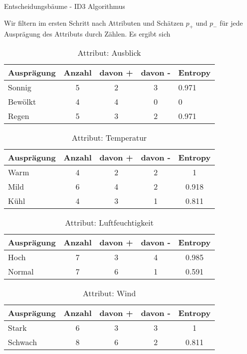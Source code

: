 \begin{task}[credit=16]{Entscheidungsbäume - ID3 Algorithmus}
\begin{subtask}[points=10,title=ID3 Algorithmus]
\begin{solution}
Wir filtern im ersten Schritt nach Attributen und Schätzen $p_+$ und $p_-$ für jede Ausprägung des Attributs durch Zählen. Es ergibt sich
\begin{table}[h!]
	\centering
	\caption{Attribut: Ausblick}
	\begin{tabular}{l|c|c|c|l}
		\toprule
		\textbf{Ausprägung} & \textbf{Anzahl} & \textbf{davon +}  & \textbf{davon -} &\textbf{Entropy} \\
		\midrule
		Sonnig    & 5 &2&3&0.971   \\
		Bewölkt & 4&4&0&0  \\
		Regen    & 5&3&2&0.971    \\
		\bottomrule
	\end{tabular}
\end{table}
\begin{table}[h!]
	\centering
	\caption{Attribut: Temperatur}
	\begin{tabular}{l|c|c|c|c}
		\toprule
		\textbf{Ausprägung} & \textbf{Anzahl} & \textbf{davon +}  & \textbf{davon -} &\textbf{Entropy} \\
		\midrule
		Warm  & 4 &2&2&1      \\
		Mild & 6&4&2&0.918   \\
		Kühl & 4&3&1&0.811    \\
		\bottomrule
	\end{tabular}
\end{table}
\begin{table}[h!]
	\centering
	\caption{Attribut: Luftfeuchtigkeit}
	\begin{tabular}{l|c|c|c|c}
		\toprule
		\textbf{Ausprägung} & \textbf{Anzahl} & \textbf{davon +}  & \textbf{davon -} &\textbf{Entropy} \\
		\midrule
		Hoch  & 7 &3&4&0.985      \\
		Normal & 7&6&1&0.591   \\
		\bottomrule
	\end{tabular}
\end{table}
\begin{table}[h!]
	\centering
	\caption{Attribut: Wind}
	\begin{tabular}{l|c|c|c|c}
		\toprule
		\textbf{Ausprägung} & \textbf{Anzahl} & \textbf{davon +}  & \textbf{davon -} &\textbf{Entropy} \\
		\midrule
		Stark  & 6 &3&3&1      \\
		Schwach &8&6&2&0.811   \\
		\bottomrule
	\end{tabular}

\end{table}
\end{solution}
\end{subtask}
\end{task}
